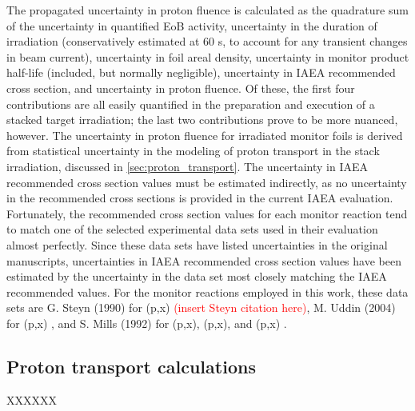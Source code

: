 \documentclass[3p]{elsarticle}
\newcommand{\textred}[1]{\textcolor{red}{ #1}}
\newcommand{\comment}[1]{\todo[color=blue!20!white,inline]{ASV: #1}}
\begin{document}
\comment{Add missing citations here}

The propagated uncertainty in proton fluence is calculated as the quadrature sum of the uncertainty in quantified EoB activity, uncertainty in the duration of irradiation (conservatively estimated at 60 s, to account for any transient changes in beam current), uncertainty in foil areal density, uncertainty in monitor product half-life (included, but normally negligible), uncertainty in IAEA recommended cross section, and uncertainty in proton fluence.
Of these, the first four contributions are all easily quantified in the preparation and execution of a stacked target irradiation;  the last two contributions prove to be more nuanced, however.
The uncertainty in proton fluence for irradiated monitor foils is derived from statistical uncertainty in the modeling of proton transport in the stack irradiation, discussed in \autoref{sec:proton_transport}.
The uncertainty in IAEA recommended cross section values must be estimated indirectly, as no uncertainty in the  recommended cross sections is provided in the current IAEA evaluation.
Fortunately, the recommended cross section values for each monitor reaction tend to match one of the   selected experimental data sets used in their evaluation almost perfectly.
Since these data sets have listed uncertainties in the original manuscripts, uncertainties in  IAEA recommended cross section values have been estimated by the uncertainty in the data set most closely matching the  IAEA recommended  values.
For the monitor reactions employed in this work, these data sets are G. Steyn (1990) for  (p,x) \textred{(insert Steyn citation here)}, M. Uddin (2004) for (p,x) \cite{Uddin2004}, and S. Mills (1992) for (p,x), (p,x), and (p,x) \cite{Mills1992}.




\subsection{Proton transport calculations}\label{sec:proton_transport}

XXXXXX



\end{document}
